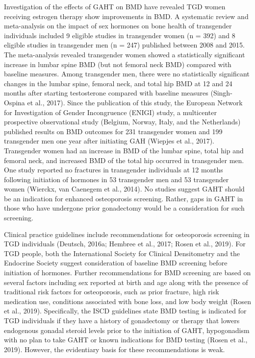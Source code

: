 \documentclass[
]{book}
\begin{document}
Investigation of the effects of GAHT on BMD
have revealed TGD women receiving estrogen
therapy show improvements in BMD. A systematic review and meta-analysis on the impact of
sex hormones on bone health of transgender
individuals included 9 eligible studies in transgender women (n = 392) and 8 eligible studies in
transgender men (n = 247) published between
2008 and 2015. The meta-analysis revealed transgender women showed a statistically significant
increase in lumbar spine BMD (but not femoral
neck BMD) compared with baseline measures.
Among transgender men, there were no statistically significant changes in the lumbar spine,
femoral neck, and total hip BMD at 12 and 24
months after starting testosterone compared with
baseline measures (Singh-Ospina et al., 2017).
Since the publication of this study, the European
Network for Investigation of Gender Incongruence
(ENIGI) study, a multicenter prospective observational study (Belgium, Norway, Italy, and the
Netherlands) published results on BMD outcomes
for 231 transgender women and 199 transgender
men one year after initiating GAH (Wiepjes
et al., 2017). Transgender women had an increase
in BMD of the lumbar spine, total hip and
femoral neck, and increased BMD of the total
hip occurred in transgender men. One study
reported no fractures in transgender individuals
at 12 months following initiation of hormones in
53 transgender men and 53 transgender women
(Wierckx, van Caenegem et al., 2014). No studies
suggest GAHT should be an indication for
enhanced osteoporosis screening. Rather, gaps in
GAHT in those who have undergone prior gonadectomy would be a consideration for such
screening.

Clinical practice guidelines include recommendations for osteoporosis screening in TGD individuals (Deutsch, 2016a; Hembree et al., 2017;
Rosen et al., 2019). For TGD people, both the
International Society for Clinical Densitometry
and the Endocrine Society suggest consideration
of baseline BMD screening before initiation of
hormones. Further recommendations for BMD
screening are based on several factors including
sex reported at birth and age along with the presence of traditional risk factors for osteoporosis,
such as prior fracture, high risk medication use,
conditions associated with bone loss, and low
body weight (Rosen et al., 2019). Specifically, the
ISCD guidelines state BMD testing is indicated
for TGD individuals if they have a history of
gonadectomy or therapy that lowers endogenous
gonadal steroid levels prior to the initiation of
GAHT, hypogonadism with no plan to take
GAHT or known indications for BMD testing
(Rosen et al., 2019). However, the evidentiary
basis for these recommendations is weak.
\end{document}
